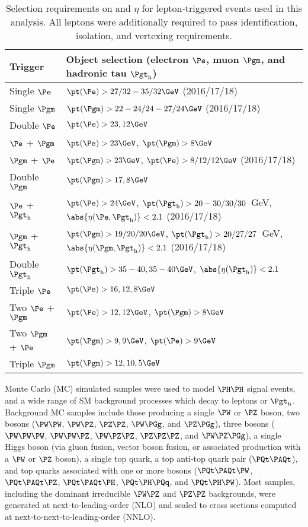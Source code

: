 \begin{table}[!h]
\begin{center}
\begin{tabular}{|l|l|}

\hline
Trigger            & Object selection (electron $\Pe$, muon $\Pgm$, and hadronic tau $\tauh$) \\
\hline
Single $\Pe$       & $\pt(\Pe) > 27 / 32 - 35 / 32\GeV$ (2016/17/18) \\
Single $\Pgm$      & $\pt(\Pgm) > 22 - 24 / 24 - 27 / 24\GeV$ (2016/17/18) \\ 
\hline
Double $\Pe$       & $\pt(\Pe) > 23, 12\GeV$ \\
$\Pe$ + $\Pgm$     & $\pt(\Pe) > 23\GeV$, $\pt(\Pgm) > 8\GeV$ \\
$\Pgm$ + $\Pe$     & $\pt(\Pgm) > 23\GeV$, $\pt(\Pe) > 8 / 12 / 12\GeV$ (2016/17/18) \\
Double $\Pgm$      & $\pt(\Pgm) > 17, 8\GeV$ \\
$\Pe$ + $\tauh$    & $\pt(\Pe) > 24\GeV$, $\pt(\tauh) > 20 - 30 / 30 / 30$~GeV, $\abs{\eta(\Pe, \tauh)} < 2.1$ (2016/17/18) \\
$\Pgm$ + $\tauh$   & $\pt(\Pgm) > 19 / 20 / 20\GeV$, $\pt(\tauh) > 20 / 27 / 27$~GeV, $\abs{\eta(\Pgm, \tauh)} < 2.1$ (2016/17/18) \\
Double $\tauh$     & $\pt(\tauh) > 35 - 40, 35 - 40\GeV$, $\abs{\eta(\tauh)} < 2.1$  \\
\hline
Triple $\Pe$       & $\pt(\Pe) > 16, 12, 8\GeV$ \\
Two $\Pe$ + $\Pgm$ & $\pt(\Pe) > 12, 12\GeV$, $\pt(\Pgm) > 8\GeV$ \\
Two $\Pgm$ + $\Pe$ & $\pt(\Pgm) > 9, 9\GeV$, $\pt(\Pe) > 9\GeV$ \\
Triple $\Pgm$      & $\pt(\Pgm) > 12, 10, 5\GeV$ \\
\hline

\end{tabular}
\end{center}
\caption{
  Selection requirements on \pt and $\eta$ for lepton-triggered events used in this analysis.  All
  leptons were additionally required to pass identification, isolation, and vertexing requirements.
}
\label{tab:triggers}
\end{table}


Monte Carlo (MC) simulated samples were used to model $\HH$ signal events, and a wide range
of SM background processes which decay to leptons or $\tauh$.  Background MC samples
include those producing a single $\PW$ or $\PZ$ boson, two bosons ($\PW\PW$, $\PW\PZ$, $\PZ\PZ$, $\PW\Pgg$, and $\PZ\Pgg$),
three bosons ($\PW\PW\PW$, $\PW\PW\PZ$, $\PW\PZ\PZ$, $\PZ\PZ\PZ$, and $\PW\PZ\Pgg$), a single Higgs boson (via gluon fusion,
vector boson fusion, or associated production with a $\PW$ or $\PZ$ boson), a single top quark,
a top anti-top quark pair ($\ttbar$), and top quarks associated with one or more bosons ($\ttW$,
$\ttZ$, $\ttH$, $\tHq$, and $\tHW$).  Most samples, including the dominant irreducible $\PW\PZ$ and $\PZ\PZ$
backgrounds, were generated at next-to-leading-order (NLO) and scaled to cross sections
computed at next-to-next-to-leading-order (NNLO).

